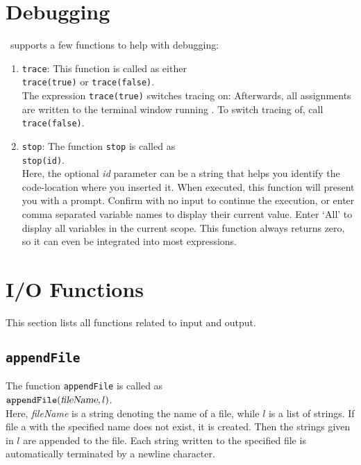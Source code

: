 \section{Debugging}
\setlx\ supports a few functions to help with debugging:
\begin{enumerate}
\item \texttt{trace}:  This function is called as either
      \\[0.2cm]
      \hspace*{1.3cm}
      \texttt{trace(true)} \quad or \quad \texttt{trace(false)}.
      \\[0.2cm]
      The expression \texttt{trace(true)} switches tracing on:  Afterwards, all
      assignments are written to the terminal window running \setlx.  To switch tracing
      of, call \texttt{trace(false)}.
\item \texttt{stop}:  The function \texttt{stop}  is called as
      \\[0.2cm]
      \hspace*{1.3cm}
      \texttt{stop(id)}.
      \\[0.2cm]
      Here, the optional \textsl{id} parameter can be a string that helps you identify the
      code-location where you inserted it. When executed, this function will present you with a
      prompt. Confirm with no input to continue the execution, or enter comma separated variable
      names to display their current value. Enter `All' to display all variables in the current scope.
      This function always returns zero, so it can even be integrated into most expressions.
\end{enumerate}


\section{I/O Functions}
This  section lists all functions related to input and output.

\subsection{\texttt{appendFile}}
The function \texttt{appendFile} is called as
\\[0.2cm]
\hspace*{1.3cm}
$\mathtt{appendFile}(\textsl{fileName}, l)$.
\\[0.2cm]
Here, \textsl{fileName} is a string denoting the name of a file, while $l$ is a list of
strings.  If file a with the specified name does not exist, it is created.  Then the strings
given in $l$ are appended to the file.   Each string written to the specified file is
automatically  terminated by a newline character.

